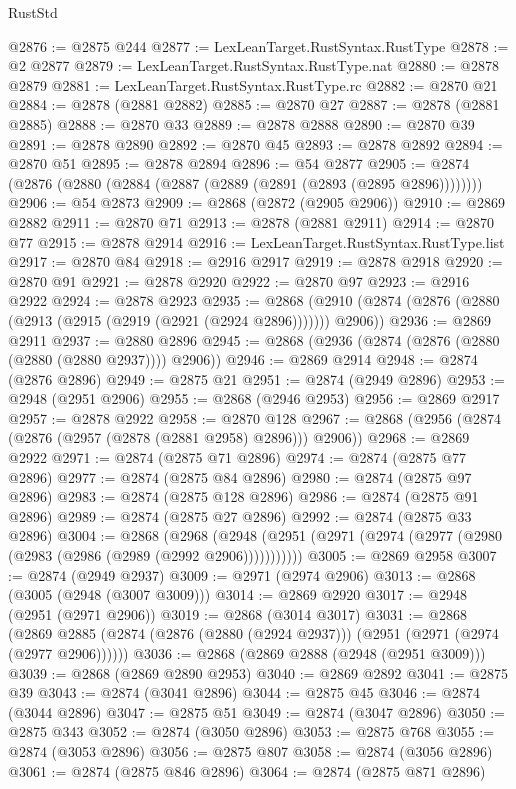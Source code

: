 \begin{lexlean}{RustStd}
\begin{coremodule}
{{{{{{{{{{{{{{{{{{{@2876 := @2875 @244
@2877 := LexLeanTarget.RustSyntax.RustType
@2878 := @2 @2877
@2879 := LexLeanTarget.RustSyntax.RustType.nat
@2880 := @2878 @2879
@2881 := LexLeanTarget.RustSyntax.RustType.rc
@2882 := @2870 @21
@2884 := @2878 (@2881 @2882)
@2885 := @2870 @27
@2887 := @2878 (@2881 @2885)
@2888 := @2870 @33
@2889 := @2878 @2888
@2890 := @2870 @39
@2891 := @2878 @2890
@2892 := @2870 @45
@2893 := @2878 @2892
@2894 := @2870 @51
@2895 := @2878 @2894
@2896 := @54 @2877
@2905 := @2874 (@2876 (@2880 (@2884 (@2887 (@2889 (@2891 (@2893 (@2895 @2896))))))))
@2906 := @54 @2873
@2909 := @2868 (@2872 (@2905 @2906))
@2910 := @2869 @2882
@2911 := @2870 @71
@2913 := @2878 (@2881 @2911)
@2914 := @2870 @77
@2915 := @2878 @2914
@2916 := LexLeanTarget.RustSyntax.RustType.list
@2917 := @2870 @84
@2918 := @2916 @2917
@2919 := @2878 @2918
@2920 := @2870 @91
@2921 := @2878 @2920
@2922 := @2870 @97
@2923 := @2916 @2922
@2924 := @2878 @2923
@2935 := @2868 (@2910 (@2874 (@2876 (@2880 (@2913 (@2915 (@2919 (@2921 (@2924 @2896))))))) @2906))
@2936 := @2869 @2911
@2937 := @2880 @2896
@2945 := @2868 (@2936 (@2874 (@2876 (@2880 (@2880 (@2880 @2937)))) @2906))
@2946 := @2869 @2914
@2948 := @2874 (@2876 @2896)
@2949 := @2875 @21
@2951 := @2874 (@2949 @2896)
@2953 := @2948 (@2951 @2906)
@2955 := @2868 (@2946 @2953)
@2956 := @2869 @2917
@2957 := @2878 @2922
@2958 := @2870 @128
@2967 := @2868 (@2956 (@2874 (@2876 (@2957 (@2878 (@2881 @2958) @2896))) @2906))
@2968 := @2869 @2922
@2971 := @2874 (@2875 @71 @2896)
@2974 := @2874 (@2875 @77 @2896)
@2977 := @2874 (@2875 @84 @2896)
@2980 := @2874 (@2875 @97 @2896)
@2983 := @2874 (@2875 @128 @2896)
@2986 := @2874 (@2875 @91 @2896)
@2989 := @2874 (@2875 @27 @2896)
@2992 := @2874 (@2875 @33 @2896)
@3004 := @2868
    (@2968 (@2948 (@2951 (@2971 (@2974 (@2977 (@2980 (@2983 (@2986 (@2989 (@2992 @2906)))))))))))
@3005 := @2869 @2958
@3007 := @2874 (@2949 @2937)
@3009 := @2971 (@2974 @2906)
@3013 := @2868 (@3005 (@2948 (@3007 @3009)))
@3014 := @2869 @2920
@3017 := @2948 (@2951 (@2971 @2906))
@3019 := @2868 (@3014 @3017)
@3031 := @2868
    (@2869 @2885 (@2874 (@2876 (@2880 (@2924 @2937))) (@2951 (@2971 (@2974 (@2977 @2906))))))
@3036 := @2868 (@2869 @2888 (@2948 (@2951 @3009)))
@3039 := @2868 (@2869 @2890 @2953)
@3040 := @2869 @2892
@3041 := @2875 @39
@3043 := @2874 (@3041 @2896)
@3044 := @2875 @45
@3046 := @2874 (@3044 @2896)
@3047 := @2875 @51
@3049 := @2874 (@3047 @2896)
@3050 := @2875 @343
@3052 := @2874 (@3050 @2896)
@3053 := @2875 @768
@3055 := @2874 (@3053 @2896)
@3056 := @2875 @807
@3058 := @2874 (@3056 @2896)
@3061 := @2874 (@2875 @846 @2896)
@3064 := @2874 (@2875 @871 @2896)
}}}}}}}}}}}}}}}}}}}
\end{coremodule}
\end{lexlean}
